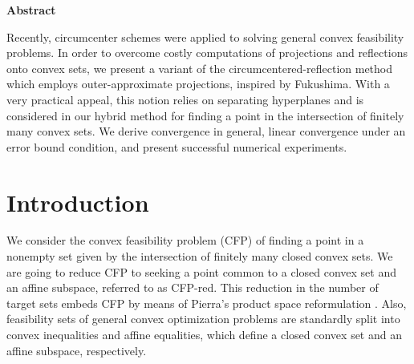 \documentclass[smallextended,numbook,nospthms]{svjour3}
\theoremstyle{plain}
\theoremstyle{definition}
\def\RR{\mathds R}
\begin{document}



\thispagestyle{empty}

\newpage
\begin{center}
\textbf{\normalsize Abstract}
\end{center}
\vspace{1pt}

Recently, circumcenter schemes were  applied to solving general convex feasibility problems. In order to overcome costly computations of projections and reflections onto convex sets, we present a variant of the circumcentered-reflection method which employs outer-approximate projections, inspired by Fukushima.
With a very practical appeal, this  notion relies on separating hyperplanes and is considered in our hybrid method for finding a point in the intersection of finitely many convex sets.  We derive convergence in general, linear convergence under an error bound condition, and present successful numerical experiments.
\thispagestyle{empty}


\newpage
\thispagestyle{empty}

\listoffigures

\listoftables

\newpage

\thispagestyle{empty}

\newpage
\tableofcontents
\thispagestyle{empty}

\newpage
\section{Introduction}
We consider the convex feasibility problem (CFP) of finding a point in a nonempty set given by the intersection of finitely many closed convex sets. We are going to reduce CFP to seeking a point common to a closed convex set and an affine subspace, referred to as CFP-red. This reduction in the number of target sets embeds CFP by means of Pierra's product space reformulation \cite{Pierra:1984hl}. Also, feasibility sets of general convex optimization problems are standardly split into convex inequalities and affine equalities, which define a closed convex set and an affine subspace, respectively.

\end{document}
